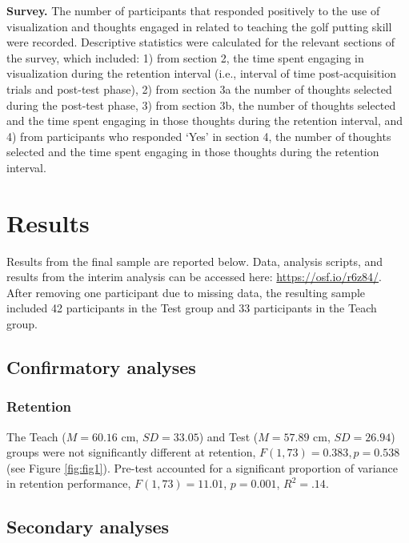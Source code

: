 \documentclass[
  english,
  man,floatsintext]{apa7}
\begin{document}
\textbf{Survey.} The number of participants that responded positively to the use of visualization and thoughts engaged in related to teaching the golf putting skill were recorded. Descriptive statistics were calculated for the relevant sections of the survey, which included: 1) from section 2, the time spent engaging in visualization during the retention interval (i.e., interval of time post-acquisition trials and post-test phase), 2) from section 3a the number of thoughts selected during the post-test phase, 3) from section 3b, the number of thoughts selected and the time spent engaging in those thoughts during the retention interval, and 4) from participants who responded `Yes' in section 4, the number of thoughts selected and the time spent engaging in those thoughts during the retention interval.

\hypertarget{results}{%
\section{Results}\label{results}}

Results from the final sample are reported below. Data, analysis scripts, and results from the interim analysis can be accessed here: \url{https://osf.io/r6z84/}. After removing one participant due to missing data, the resulting sample included 42 participants in the Test group and 33 participants in the Teach group.

\hypertarget{confirmatory-analyses}{%
\subsection{Confirmatory analyses}\label{confirmatory-analyses}}

\hypertarget{retention}{%
\subsubsection{Retention}\label{retention}}

The Teach (\(M = 60.16\) cm, \(SD = 33.05\)) and Test (\(M = 57.89\) cm, \(SD = 26.94\)) groups were not significantly different at retention, \(F(1,73) = 0.383, p = 0.538\) (see Figure \ref{fig:fig1}). Pre-test accounted for a significant proportion of variance in retention performance, \(F(1,73) = 11.01\), \(p = 0.001\), \(R^{2} = .14\).



\hypertarget{secondary-analyses}{%
\subsection{Secondary analyses}\label{secondary-analyses}}
\end{document}
